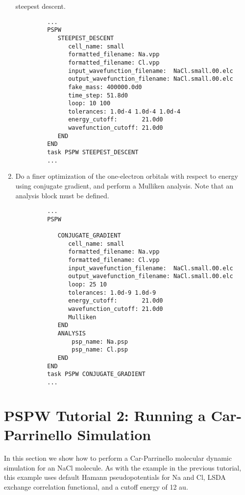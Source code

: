 \begin{enumerate}
      steepest descent.
\tiny \begin{verbatim}
         ...
         PSPW
            STEEPEST_DESCENT
               cell_name: small
               formatted_filename: Na.vpp
               formatted_filename: Cl.vpp
               input_wavefunction_filename:  NaCl.small.00.elc
               output_wavefunction_filename: NaCl.small.00.elc
               fake_mass: 400000.0d0
               time_step: 51.8d0
               loop: 10 100
               tolerances: 1.0d-4 1.0d-4 1.0d-4
               energy_cutoff:       21.0d0
               wavefunction_cutoff: 21.0d0
            END 
         END
         task PSPW STEEPEST_DESCENT
         ...
      \end{verbatim}
\normalsize
\item Do a finer optimization of the one-electron orbitals with respect to energy using
      conjugate gradient, and perform a Mulliken analysis. Note that an analysis
      block must be defined. 
   \tiny \begin{verbatim}
         ...
         PSPW
           
            CONJUGATE_GRADIENT
               cell_name: small
               formatted_filename: Na.vpp
               formatted_filename: Cl.vpp
               input_wavefunction_filename:  NaCl.small.00.elc
               output_wavefunction_filename: NaCl.small.00.elc
               loop: 25 10
               tolerances: 1.0d-9 1.0d-9 
               energy_cutoff:       21.0d0
               wavefunction_cutoff: 21.0d0
               Mulliken
            END 
            ANALYSIS
                psp_name: Na.psp
                psp_name: Cl.psp
            END
         END
         task PSPW CONJUGATE_GRADIENT
         ...
      \end{verbatim}


\end{enumerate}
\normalsize


\normalsize
\section{PSPW Tutorial 2: Running a Car-Parrinello Simulation}
\label{sec:pspw_cp}

In this section we show how to perform a Car-Parrinello
molecular dynamic simulation for an NaCl molecule.  As with the example in 
the previous tutorial,  this example uses default Hamann 
pseudopotentials for Na and Cl, LSDA exchange 
correlation functional, and a cutoff energy of 12 au.

